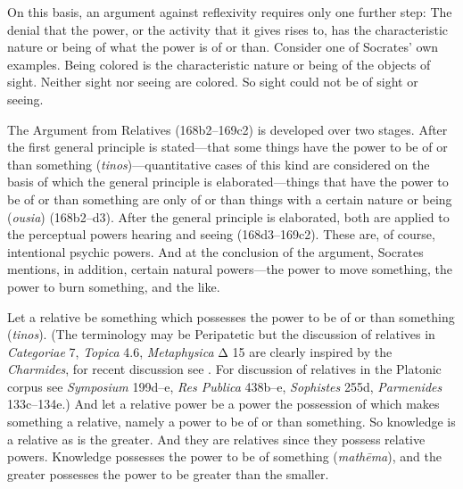 On this basis, an argument against reflexivity requires only one further step: The denial that the power, or the activity that it gives rises to, has the characteristic nature or being of what the power is of or than. Consider one of Socrates' own examples. Being colored is the characteristic nature or being of the objects of sight. Neither sight nor seeing are colored. So sight could not be of sight or seeing.

The Argument from Relatives (168b2–169c2) is developed over two stages. After the first general principle is stated—that some things have the power to be of or than something (\emph{tinos})—quantitative cases of this kind are considered on the basis of which the general principle is elaborated—things that have the power to be of or than something are only of or than things with a certain nature or being (\emph{ousia}) (168b2–d3). After the general principle is elaborated, both are applied to the perceptual powers hearing and seeing (168d3–169c2). These are, of course, intentional psychic powers. And at the conclusion of the argument, Socrates mentions, in addition, certain natural powers—the power to move something, the power to burn something, and the like.

Let a relative be something which possesses the power to be of or than something (\emph{tinos}). (The terminology may be Peripatetic but the discussion of relatives in \emph{Categoriae} 7, \emph{Topica} 4.6, \emph{Metaphysica} {\sbl Δ} 15 are clearly inspired by the \emph{Charmides}, for recent discussion see \citealt[chapters 5–7]{Duncombe:2020gi}. For discussion of relatives in the Platonic corpus see \emph{Symposium} 199d–e, \emph{Res Publica} 438b–e, \emph{Sophistes} 255d, \emph{Parmenides} 133c–134e.) And let a relative power be a power the possession of which makes something a relative, namely a power to be of or than something. So knowledge is a relative as is the greater. And they are relatives since they possess relative powers. Knowledge possesses the power to be of something (\emph{mathēma}), and the greater possesses the power to be greater than the smaller.

